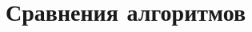 \documentclass[12pt, specialist, subf
]{disser}
\theoremstyle{definition}
\begin{document}


\newpage




\chapter{Сравнения алгоритмов}
\end{document}

